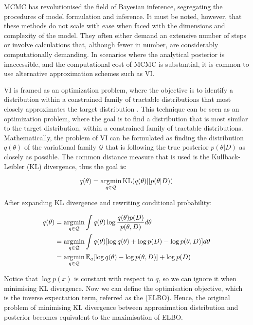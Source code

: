 \ac{MCMC} has revolutionised the field of Bayesian inference, segregating the procedures of model formulation and inference. It must be noted, however, that these methods do not scale with ease when faced with the dimensions and complexity of the model. They often either demand an extensive number of steps or involve calculations that, although fewer in number, are considerably computationally demanding. In scenarios where the analytical posterior is inaccessible, and the computational cost of \ac{MCMC} is substantial, it is common to use alternative approximation schemes such as \ac{VI}.

\acl{VI} is framed as an optimization problem, where the objective is to identify a distribution within a constrained family of tractable distributions that most closely approximates the target distribution \citep{Blei2017-dm}. This technique can be seen as an optimization problem, where the goal is to find a distribution that is most similar to the target distribution, within a constrained family of tractable distributions. Mathematically, the problem of \acl{VI} can be formulated as finding the distribution $q(\theta)$ of the variational family $\mathcal{Q}$ that is following the true posterior $p(\theta | D)$ as closely as possible. The common distance measure that is used is the Kullback-Leibler (KL) divergence, thus the goal is:

\begin{equation}
q(\theta) = \operatorname*{\arg\!\min}_{q \in \mathcal{Q}} \text{KL}(q(\theta) || p(\theta | D))  
\end{equation}

After expanding KL divergence and rewriting conditional probability:

\begin{align}
q(\theta) &= \operatorname*{\arg\!\min}_{q \in \mathcal{Q}} \int q(\theta) \log \frac{q(\theta) p(D)}{p(\theta, D)} d\theta \\
&= \operatorname*{\arg\!\min}_{q \in \mathcal{Q}} \int q(\theta) [\log q(\theta) + \log p(D) - \log p(\theta, D)] d\theta \\
&= \operatorname*{\arg\!\min}_{q \in \mathcal{Q}} \mathbb{E}_q [\log q(\theta) -  \log p(\theta, D)] + \log p(D)
\end{align}

Notice that $\log p(x)$ is constant with respect to $q$, so we can ignore it when minimising KL divergence. Now we can define the optimisation objective, which is the inverse expectation term, referred as the  (ELBO). Hence, the original problem of minimising KL divergence between approximation distribution and posterior becomes equivalent to the maximisation of ELBO. 

